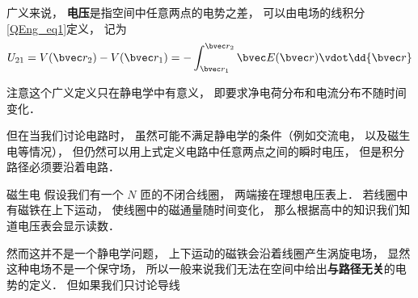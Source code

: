 

广义来说， \textbf{电压}是指空间中任意两点的电势之差， 可以由电场的线积分\autoref{QEng_eq1}定义， 记为
\begin{equation}
U_{21} = V(\bvec r_2) - V(\bvec r_1) = - \int_{\bvec r_1}^{\bvec r_2} \bvec E(\bvec r) \vdot \dd{\bvec r}
\end{equation}

注意这个广义定义只在静电学中有意义， 即要求净电荷分布和电流分布不随时间变化．

但在当我们讨论电路时， 虽然可能不满足静电学的条件（例如交流电， 以及磁生电等情况）， 但仍然可以用上式定义电路中任意两点之间的瞬时电压， 但是积分路径必须要沿着电路．

\begin{exercise}{磁生电}
假设我们有一个 $N$ 匝的不闭合线圈， 两端接在理想电压表上． 若线圈中有磁铁在上下运动， 使线圈中的磁通量随时间变化， 那么根据高中的知识我们知道电压表会显示读数．

然而这并不是一个静电学问题， 上下运动的磁铁会沿着线圈产生涡旋电场， 显然这种电场不是一个保守场， 所以一般来说我们无法在空间中给出\textbf{与路径无关}的电势的定义． 但如果我们只讨论导线
\end{exercise}
